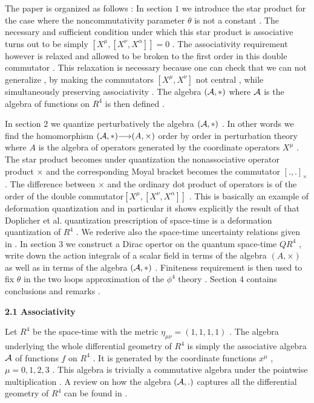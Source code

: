 \documentclass[a4paper,12pt]{article}
\let\oldtheequation=\theequation
\def\doteqs#1{\setcounter{equation}{0}
            \def\theequation{{#1}.\oldtheequation}}
\newcounter{sxn}
\def\sx#1{\addtocounter{sxn}{1}
\medskip \goodbreak
\noindent{\large\bf
\centerline{\thesxn.~~#1}} \nobreak \medskip}
\def\sxn#1{\sx{#1} \doteqs{\thesxn}}
\begin{document}
The paper is organized as follows : In section $1$ we introduce
the star product \cite{kon} for the case where the
noncommutativity parameter ${\theta}$ is not a constant . The
necessary and sufficient condition under which this star product
is associative turns out to be  simply
$[X^{\mu},[X^{\nu},X^{\alpha}]]=0$ . The associativity
requirement however is relaxed and allowed to be broken to the
first order in this double commutator . This relaxation is
necessary because one can check that we can not generalize
\cite{dop} , by making the commutators $[X^{\mu},X^{\nu}]$ not
central , while simultaneously preserving associativity . The
algebra $({\cal A},*)$ where ${\cal A}$ is the algebra of
functions on $R^4$ is then defined .

 In section $2$ we quantize
perturbatively the algebra $({\cal A},*)$ . In other words we
find the homomorphism $({\cal A},*)
{\longrightarrow}(A,{\times})$ order by order in perturbation
theory where $A$ is the algebra of operators generated by the
coordinate operators $X^{\mu}$ . The star product becomes under
quantization the nonassociative operator product ${\times}$ and
the corresponding Moyal bracket becomes the commutator
$[.,.]_{\times}$\cite{merkulov} . The difference between
${\times}$ and the ordinary dot product of operators is of the
order of the  double commutator$[X^{\mu},[X^{\nu},X^{\alpha}]]$ .
This is basically an example of deformation quantization
\cite{kon,merkulov,rieffel,gracia} and in particular it shows
explicitly the result of \cite{rieffel} that Doplicher et
al.\cite{dop} quantization prescription of space-time is a
deformation quantization of $R^4$  . We rederive also the
space-time uncertainty relations given in \cite{dop}  . In
section $3$ we construct a Dirac opertor on the quantum
space-time $QR^4$ , write down the action integrals of a scalar
field in terms of the algebra $(A,{\times})$ as well as in terms
of the algebra $({\cal A},*)$ . Finiteness requirement is then
used to fix ${\theta}$ in the two loops approximation of the
${\phi}^4$ theory  . Section $4$ contains conclusions and remarks
.


\sxn{The Star Product}

\vskip 5mm \noindent
{\bf 2.1 Associativity}
\vskip 5mm \noindent

Let $R^4$ be the space-time with the metric
${\eta}_{{\mu}{\nu}}=(1,1,1,1)$ . The algebra underlying the
whole differential geometry of $R^4$ is simply the associative
algebra ${\cal A}$ of functions $f$ on $R^4$ . It is generated by
the coordinate functions $x^{\mu}$ , ${\mu}=0,1,2,3$ . This
algebra is trivially a commutative algebra under the pointwise
multiplication . A review on how the algebra $({\cal A},.)$
captures all the differential geometry of $R^4$ can be found in
\cite{coq,madore,landi,varilly} .
\end{document}
